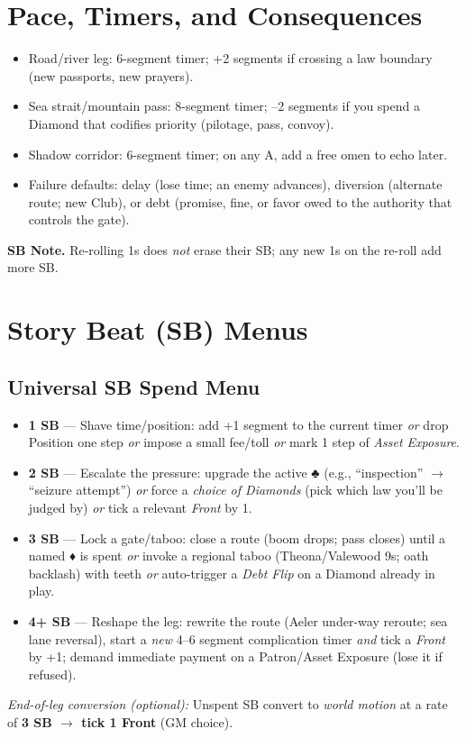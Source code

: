 \documentclass[12pt,oneside]{book}
\renewcommand{\clubsuit}{♣}
\renewcommand{\diamondsuit}{♦}
\begin{document}
\section{Pace, Timers, and Consequences}

\begin{itemize}
\item Road/river leg: 6-segment timer; +2 segments if crossing a law boundary (new passports, new prayers).
\item Sea strait/mountain pass: 8-segment timer; --2 segments if you spend a Diamond that codifies priority (pilotage, pass, convoy).
\item Shadow corridor: 6-segment timer; on any A, add a free omen to echo later.
\item Failure defaults: delay (lose time; an enemy advances), diversion (alternate route; new Club), or debt (promise, fine, or favor owed to the authority that controls the gate).
\end{itemize}

\noindent\textbf{SB Note.} Re-rolling 1s does \emph{not} erase their SB; any new 1s on the re-roll add more SB.

\section{Story Beat (SB) Menus}

\subsection{Universal SB Spend Menu}
\begin{itemize}
  \item \textbf{1 SB} --- Shave time/position: add +1 segment to the current timer \emph{or} drop Position one step \emph{or} impose a small fee/toll \emph{or} mark 1 step of \emph{Asset Exposure}.
  \item \textbf{2 SB} --- Escalate the pressure: upgrade the active \clubsuit{} (e.g., ``inspection'' $\rightarrow$ ``seizure attempt'') \emph{or} force a \emph{choice of Diamonds} (pick which law you'll be judged by) \emph{or} tick a relevant \emph{Front} by 1.
  \item \textbf{3 SB} --- Lock a gate/taboo: close a route (boom drops; pass closes) until a named \diamondsuit{} is spent \emph{or} invoke a regional taboo (Theona/Valewood 9s; oath backlash) with teeth \emph{or} auto-trigger a \emph{Debt Flip} on a Diamond already in play.
  \item \textbf{4+ SB} --- Reshape the leg: rewrite the route (Aeler under-way reroute; sea lane reversal), start a \emph{new} 4--6 segment complication timer \emph{and} tick a \emph{Front} by +1; demand immediate payment on a Patron/Asset Exposure (lose it if refused).
\end{itemize}
\textit{End-of-leg conversion (optional):} Unspent SB convert to \emph{world motion} at a rate of \textbf{3 SB $\rightarrow$ tick 1 Front} (GM choice).
\end{document}
